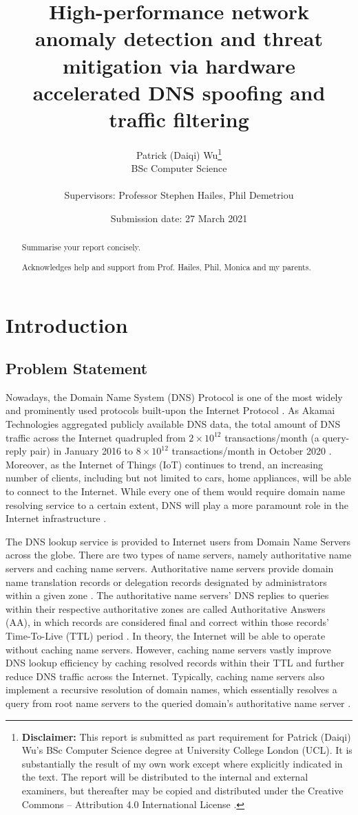 \documentclass[a4paper]{report}
\title{{\vspace{-14em}}
{{\Huge High-performance network anomaly detection and threat mitigation via hardware accelerated DNS spoofing and traffic filtering}} \\
{\large}}
\date{Submission date: 27 March 2021}
\author{Patrick (Daiqi) Wu\thanks{
{\bf Disclaimer:}
This report is submitted as part requirement for Patrick (Daiqi) Wu's BSc Computer Science degree at University College London (UCL). It is
substantially the result of my own work except where explicitly indicated in the text.
The report will be distributed to the internal and external examiners, but thereafter may be copied and distributed under the Creative Commons -- Attribution 4.0 International License \cite{cc-by-4.0}.}
\\
BSc Computer Science\\ \\
Supervisors: Professor Stephen Hailes, Phil Demetriou}
\begin{document}
 
\onehalfspacing
\maketitle
\begin{abstract}
Summarise your report concisely.
\end{abstract}

\renewcommand{\abstractname}{Acknowledgements}
\begin{abstract}
Acknowledges help and support from Prof. Hailes, Phil, Monica and my parents.
\end{abstract}

\tableofcontents

\newpage
\setcounter{page}{1}

\chapter{Introduction}

\section{Problem Statement}
\label{section:introduction-problemstatement}

Nowadays, the Domain Name System (DNS) Protocol is one of the most widely and prominently used protocols built-upon the Internet Protocol \cite{RFC-1034}. As Akamai Technologies aggregated publicly available DNS data, the total amount of DNS traffic across the Internet quadrupled from $ 2 \times 10^{12}$ transactions/month (a query-reply pair) in January 2016 to $8 \times 10^{12}$ transactions/month in October 2020 \cite{DNS-Trends-and-Traffic}. Moreover, as the Internet of Things (IoT) continues to trend, an increasing number of clients, including but not limited to cars, home appliances, will be able to connect to the Internet. While every one of them would require domain name resolving service to a certain extent, DNS will play a more paramount role in the Internet infrastructure \cite{satam2015anomaly}.

The DNS lookup service is provided to Internet users from Domain Name Servers across the globe. There are two types of name servers, namely authoritative name servers and caching name servers. Authoritative name servers provide domain name translation records or delegation records designated by administrators within a given zone \cite{BCP-219}. The authoritative name servers' DNS replies to queries within their respective authoritative zones are called Authoritative Answers (AA), in which records are considered final and correct within those records' Time-To-Live (TTL) period \cite{BCP-219, RFC-1035}. In theory, the Internet will be able to operate without caching name servers. However, caching name servers vastly improve DNS lookup efficiency by caching resolved records within their TTL and further reduce DNS traffic across the Internet. Typically, caching name servers also implement a recursive resolution of domain names, which essentially resolves a query from root name servers to the queried domain's authoritative name server \cite{finch-2015}.
\end{document}
